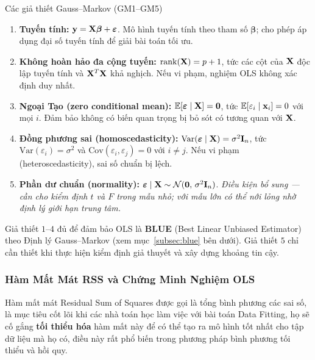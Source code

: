 \begin{mydef}{Các giả thiết Gauss--Markov (GM1–GM5)}{}
\begin{enumerate}[label=\textbf{\arabic*.}, leftmargin=2.5cm, noitemsep]
    \item \textbf{Tuyến tính:} $\mathbf{y} = \mathbf{X}\boldsymbol{\beta} + \boldsymbol{\varepsilon}$.
          Mô hình tuyến tính theo tham số $\boldsymbol{\beta}$; cho phép áp dụng
          đại số tuyến tính để giải bài toán tối ưu.

    \item \textbf{Không hoàn hảo đa cộng tuyến:} $\operatorname{rank}(\mathbf{X}) = p + 1$,
          tức các cột của $\mathbf{X}$ độc lập tuyến tính và $\mathbf{X}^T\mathbf{X}$ khả nghịch.
          Nếu vi phạm, nghiệm OLS không xác định duy nhất.

    \item \textbf{Ngoại Tạo (zero conditional mean):}
          $\mathbb{E}[\boldsymbol{\varepsilon} \mid \mathbf{X}] = \mathbf{0}$,
          tức $\mathbb{E}[\varepsilon_i \mid \mathbf{x}_i] = 0$ với mọi $i$.
          Đảm bảo không có biến quan trọng bị bỏ sót có tương quan với $\mathbf{X}$.

    \item \textbf{Đồng phương sai (homoscedasticity):}
          $\mathrm{Var}(\boldsymbol{\varepsilon} \mid \mathbf{X}) = \sigma^2\mathbf{I}_n$,
          tức $\mathrm{Var}(\varepsilon_i) = \sigma^2$ và
          $\mathrm{Cov}(\varepsilon_i, \varepsilon_j) = 0$ với $i \neq j$.
          Nếu vi phạm (heteroscedasticity), sai số chuẩn bị lệch.

    \item \textbf{Phần dư chuẩn (normality):}
          $\boldsymbol{\varepsilon} \mid \mathbf{X} \sim \mathcal{N}(\mathbf{0},\, \sigma^2\mathbf{I}_n)$.
          \emph{Điều kiện bổ sung — cần cho kiểm định $t$ và $F$ trong mẫu nhỏ;
          với mẫu lớn có thể nới lỏng nhờ định lý giới hạn trung tâm.}
\end{enumerate}
\end{mydef}

\begin{note}
Giả thiết $1–4$ đủ để đảm bảo OLS là \textbf{BLUE} (Best Linear Unbiased Estimator)
theo Định lý Gauss--Markov (xem mục~\ref{subsec:blue} bên dưới).
Giả thiết $5$ chỉ cần thiết khi thực hiện kiểm định giả thuyết và xây dựng khoảng tin cậy.
\end{note}

\subsubsection{Hàm Mất Mát RSS và Chứng Minh Nghiệm OLS}
Hàm mất mát Residual Sum of Squares được gọi là tổng bình phương các sai số, là mục tiêu cốt lõi khi các nhà toán học làm việc với bài toán Data Fitting, họ sẽ cố gắng \textbf{tối thiểu hóa} hàm mất này để có thể tạo ra mô hình tốt nhất cho tập dữ liệu mà họ có, điều này rất phổ biến trong phương pháp bình phương tối thiểu và hồi quy.

